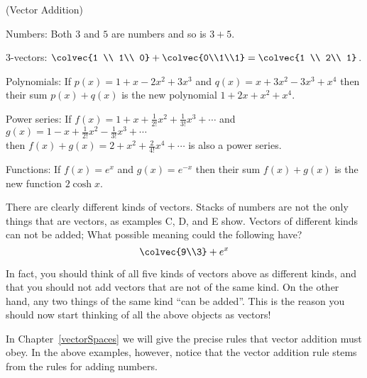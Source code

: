\begin{example} (Vector Addition)
\begin{enumext}[label=\Alph*,wrap-label=(#1)]
\item Numbers: Both $3$ and $5$ are numbers and so is $3+5$.\\[-2mm]
\item 3-vectors: $\colvec{1 \\ 1\\ 0} + \colvec{0\\1\\1}=\colvec{1 \\ 2\\ 1}$.\\[-1mm]
\item Polynomials: If $p(x)=1+x-2x^2+3x^3$ and $q(x)=x+3x^2-3x^3+x^4$ then\\[1mm] their sum $p(x)+q(x)$ is the new polynomial $1+2x+x^2+x^4$.\\
\item Power series: If $f(x)=1+x+\frac1{2!} x^2 + \frac1{3!} x^3 +\cdots$ and $g(x)=1-x+\frac1{2!} x^2 - \frac1{3!} x^3 +\cdots$ \\[1mm]
 then $f(x)+g(x)=2+ x^2 +\frac2 {4!} x^4+\cdots$ is also a power series.\\
\item Functions: If $f(x)=e^x$ and $g(x)=e^{-x}$ then their sum $f(x)+g(x)$ is the new function $2\cosh x$.
\end{enumext}
\end{example}

\noindent
There are clearly different kinds of vectors. 
Stacks of numbers are not the only things that are vectors, as examples C, D, and E show. 
Vectors of different kinds can not be added; What possible meaning could the following have? 
\[\colvec{9\\3} + e^x\]

In fact, you should think of all five kinds of vectors above as different kinds, and that you should not add vectors that are not of the same kind. 
On the other hand, any two things of the same kind ``can be added''. 
This is the reason you should now start thinking of all the above objects as vectors! 

In Chapter~\ref{vectorSpaces} we will give the precise rules that  vector addition must obey. 
In the above examples, however, notice that the vector addition rule stems from the rules for adding numbers. 
 

